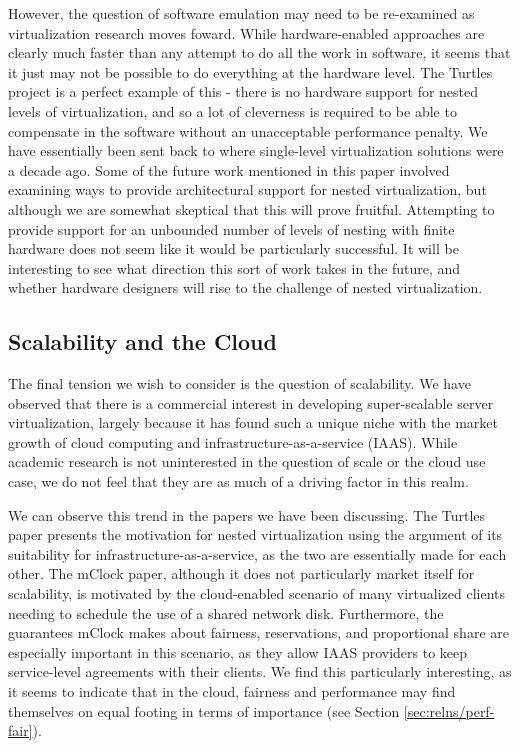 \documentclass[letterpaper, twocolumn]{article}
\begin{document}
However, the question of software emulation may need to be re-examined as virtualization
research moves foward.  While hardware-enabled approaches are clearly much faster
than any attempt to do all the work in software, it seems that it just may not be possible to do
everything at the hardware level.  The Turtles project is a perfect example of this - there
is no hardware support for nested levels of virtualization, and so a lot of cleverness
is required to be able to compensate in the software without an unacceptable performance
penalty.  We have essentially been sent back to where single-level virtualization
solutions were a decade ago.  Some of the future work mentioned in this paper involved
examining ways to provide architectural support for nested virtualization, but although
we are somewhat skeptical that this will prove fruitful.  Attempting to provide
support for an unbounded number of levels of nesting with finite hardware does
not seem like it would be particularly successful.  It will be interesting to
see what direction this sort of work takes in the future, and whether hardware
designers will rise to the challenge of nested virtualization.

\subsection{Scalability and the Cloud}
\label{sec:relns/scale}

The final tension we wish to consider is the question of scalability.  We have observed
that there is a commercial interest in developing super-scalable server virtualization,
largely because it has found such a unique niche with the market growth of cloud computing
and infrastructure-as-a-service (IAAS).  While academic research is not uninterested in the question
of scale or the cloud use case, we do not feel that they are as much of a driving factor in this realm.

We can observe this trend in the papers we have been discussing.  The Turtles paper presents
the motivation for nested virtualization using the argument of its suitability for
infrastructure-as-a-service, as the two are essentially made for each other.  The mClock paper,
although it does not particularly market itself
for scalability, is motivated by the cloud-enabled scenario of many virtualized clients
needing to schedule the use of a shared network disk.  Furthermore, the guarantees mClock
makes about fairness, reservations, and proportional share are especially important
in this scenario, as they allow IAAS providers to keep service-level agreements with
their clients.  We find this particularly interesting, as it seems to indicate
that in the cloud, fairness and performance may find themselves on equal footing in
terms of importance (see Section \ref{sec:relns/perf-fair}).
\end{document}
